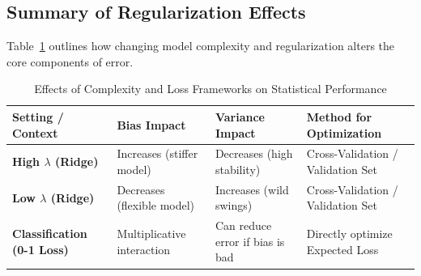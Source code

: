 \documentclass{article}
\begin{document}
\subsection{Summary of Regularization Effects}
Table~\ref{tab:ridge_classification_summary} outlines how changing model complexity and regularization alters the core components of error.

\begin{table}[htbp]
\centering
\small
\renewcommand{\arraystretch}{1.4}
\begin{tabular}{|l|l|l|l|}
\hline
\textbf{Setting / Context} & \textbf{Bias Impact} & \textbf{Variance Impact} & \textbf{Method for Optimization} \\ \hline
\textbf{High $\lambda$ (Ridge)} & Increases (stiffer model) & Decreases (high stability) & Cross-Validation / Validation Set \\ \hline
\textbf{Low $\lambda$ (Ridge)} & Decreases (flexible model) & Increases (wild swings) & Cross-Validation / Validation Set \\ \hline
\textbf{Classification (0-1 Loss)} & Multiplicative interaction & Can reduce error if bias is bad & Directly optimize Expected Loss \\ \hline
\end{tabular}
\caption{Effects of Complexity and Loss Frameworks on Statistical Performance}
\label{tab:ridge_classification_summary}
\end{table}
\end{document}
